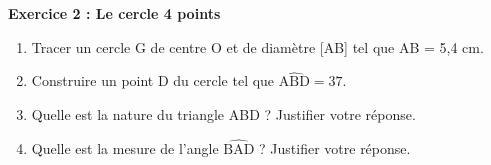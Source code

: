 \textbf{Exercice 2 : Le cercle \hfill 4 points}

\medskip

\begin{enumerate}
\item Tracer un cercle G de centre O et de diamètre [AB] tel que AB = 5,4 cm.
\item Construire un point D du cercle tel que $\widehat{\text{ABD}} = 37$\degres.
\item Quelle est la nature du triangle ABD ? Justifier votre réponse.
\item Quelle est la mesure de l'angle $\widehat{\text{BAD}}$ ? Justifier votre réponse.
\end{enumerate}

\newpage

